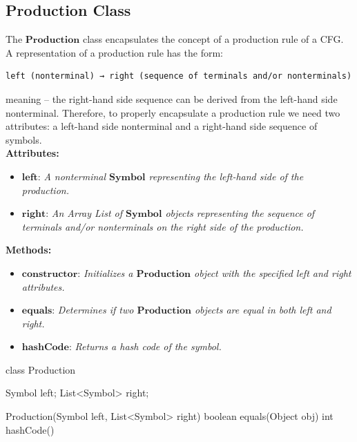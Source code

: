 \vspace{10pt}

\subsection{Production Class}

The \(\boldsymbol{Production}\) class encapsulates the concept of a production rule of a CFG. A representation of a production rule has the form:

\begin{verbatim}
left (nonterminal) → right (sequence of terminals and/or nonterminals)
\end{verbatim}

meaning – the right-hand side sequence can be derived from the left-hand side nonterminal. Therefore, to properly encapsulate a production rule we need two attributes: a left-hand side nonterminal and a right-hand side sequence of symbols.\\


\textbf{Attributes:}
\begin{itemize}
    \item \(\boldsymbol{left}\): \textit{A nonterminal \(\boldsymbol{Symbol}\) representing the left-hand side of the production.}
    \item \(\boldsymbol{right}\): \textit{An Array List of \(\boldsymbol{Symbol}\) objects representing the sequence of terminals and/or nonterminals on the right side of the production.}
\end{itemize}

\textbf{Methods:}
\begin{itemize}
    \item \(\boldsymbol{constructor}\): \textit{Initializes a \(\boldsymbol{Production}\) object with the specified left and right attributes.}
    \item \(\boldsymbol{equals}\): \textit{Determines if two \(\boldsymbol{Production}\) objects are equal in both left and right.}
    \item \(\boldsymbol{hashCode}\): \textit{Returns a hash code of the symbol.}
\end{itemize}

\begin{codeblock}
    class Production {
        Symbol left;
        List<Symbol> right;

        Production(Symbol left, List<Symbol> right) {}
        boolean equals(Object obj) {}
        int hashCode() {}
    }
\end{codeblock}


